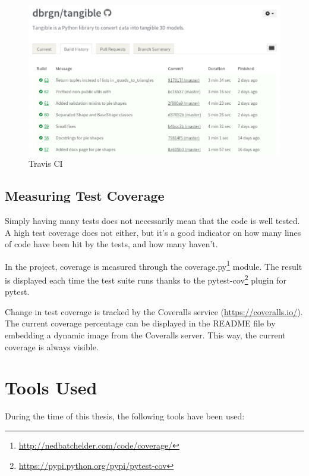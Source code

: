 \begin{figure}[H]
	\centering
	\includegraphics[width=\textwidth]{images/travis.png}
	\caption{Travis CI}
	\label{img:travis}
\end{figure}

\subsection{Measuring Test Coverage}

Simply having many tests does not necessarily mean that the code is well tested.
A high test coverage does not either, but it's a good indicator on how many
lines of code have been hit by the tests, and how many haven't.

In the \tangible{} project, coverage is measured through the
coverage.py\footnote{\url{http://nedbatchelder.com/code/coverage/}} module. The
result is displayed each time the test suite runs thanks to the
pytest-cov\footnote{\url{https://pypi.python.org/pypi/pytest-cov}} plugin for
pytest.

Change in test coverage is tracked by the Coveralls service
(\url{https://coveralls.io/}). The current coverage percentage can be displayed
in the README file by embedding a dynamic image from the Coveralls server. This
way, the current coverage is always visible.


\section{Tools Used}

During the time of this thesis, the following tools have been used:

